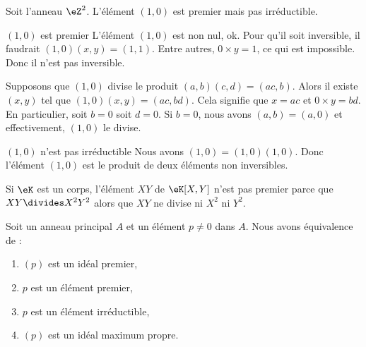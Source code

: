 \begin{example}     \label{EXooEIUEooCZCPMC}
    Soit l'anneau \( \eZ^2\). L'élément \( (1,0)\) est premier mais pas irréductible.
    \begin{subproof}
        \item[\( (1,0)\) est premier]
            L'élément \( (1,0)\) est non nul, ok. Pour qu'il soit inversible, il faudrait \( (1,0)(x,y)=(1,1)\). Entre autres, \( 0\times y=1\), ce qui est impossible. Donc il n'est pas inversible.

            Supposons que \( (1,0)\) divise le produit \( (a,b)(c,d)=(ac,b)\). Alors il existe \( (x,y)\) tel que \( (1,0)(x,y)=(ac,bd)\). Cela signifie que \( x=ac\) et \( 0\times y=bd\). En particulier, soit \( b=0\) soit \( d=0\). Si \( b=0\), nous avons \( (a,b)=(a,0)\) et effectivement, \( (1,0)\) le divise.
        \item[\( (1,0)\) n'est pas irréductible]
            Nous avons \( (1,0)=(1,0)(1,0)\). Donc l'élément \( (1,0)\) est le produit de deux éléments non inversibles.
    \end{subproof}
\end{example}

\begin{example}
    Si \( \eK\) est un corps, l'élément \( XY\) de \( \eK[X,Y]\) n'est pas premier parce que \( XY\divides X^2Y^2\) alors que \( XY\) ne divise ni \( X^2\) ni \( Y^2\).
\end{example}


\begin{proposition}     \label{PROPooZICGooNmblhl}
    Soit un anneau principal \( A\) et un élément \( p\neq 0\) dans \( A\). Nous avons équivalence de :
    \begin{enumerate}
        \item   \label{ITEMooBTEAooWlFUTX}
            \( (p)\) est un idéal premier,
        \item   \label{ITEMooKQRMooBNPDMX}
            \( p\) est un élément premier,
        \item   \label{ITEMooZYYJooCWiBhL}
            \( p\) est un élément irréductible,
        \item   \label{ITEMooHPAIooYoQzqD}
            \( (p)\) est un idéal maximum propre.
    \end{enumerate}
\end{proposition}

